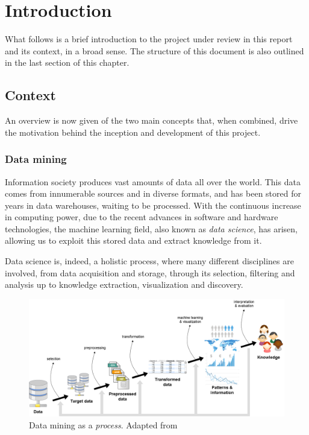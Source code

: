 \chapter{Introduction} %
\label{Chapter1Introduction} %


What follows is a brief introduction to the project under review in this report and its context,
in a broad sense. The structure of this document is also outlined in the last section of this chapter.

\section{Context}
\label{Introduction::Context}

An overview is now given of the two main concepts that, when combined,
drive the motivation behind the inception and development of this project.

\subsection{Data mining}
\label{Introduction::Context::DataMining}

Information society produces vast amounts of data all over the world.
This data comes from innumerable sources and in diverse formats, and has been stored
for years in data warehouses, waiting to be processed. With the continuous increase
in computing power, due to the recent advances in software and hardware technologies,
the machine learning field, also known as \textit{data science}, has arisen,
allowing us to exploit this stored data and extract knowledge from it.

Data science is, indeed, a holistic process, where many different disciplines are
involved, from data acquisition and storage, through its selection, filtering and
analysis up to knowledge extraction, visualization and discovery.

\begin{figure}[h]
	\centering
	\includegraphics[width=0.9\linewidth]{figures/data-mining-process.png}
	\caption[Data mining as a \textit{process}.]{Data mining as a \textit{process}. Adapted from~\citet{Fayyad:FromDataMining}}
	\label{fig:data-mining}
\end{figure}

